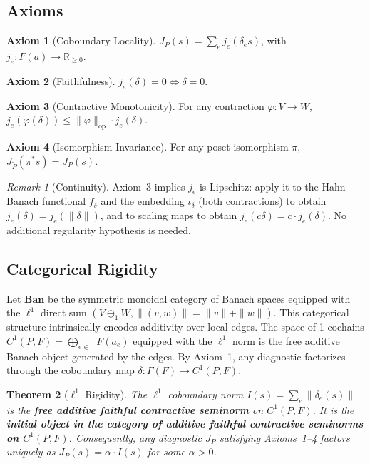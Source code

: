 \documentclass[12pt,a4paper]{amsart}
\theoremstyle{plain}
\newtheorem{theorem}{Theorem}[section]
\theoremstyle{definition}
\newtheorem{axiom}{Axiom}
\theoremstyle{remark}
\newtheorem{remark}[theorem]{Remark}
\newcommand{\R}{\mathbb{R}}
\newcommand{\Ban}{\mathbf{Ban}}
\newcommand{\op}{\mathrm{op}}
\DeclareMathOperator{\Ecov}{E_{\text{cov}}}
\begin{document}
\subsection{Axioms}

\begin{axiom}[Coboundary Locality]
$J_P(s) = \sum_{e} j_e(\delta_e s)$, with
$j_e\colon F(a) \to \R_{\geq 0}$.
\end{axiom}

\begin{axiom}[Faithfulness]
$j_e(\delta) = 0 \iff \delta = 0$.
\end{axiom}

\begin{axiom}[Contractive Monotonicity]
For any contraction $\varphi\colon V \to W$,
$j_e(\varphi(\delta)) \leq \|\varphi\|_{\op} \cdot j_e(\delta)$.
\end{axiom}

\begin{axiom}[Isomorphism Invariance]
For any poset isomorphism $\pi$,
$J_{\tilde{P}}(\pi^* s) = J_P(s)$.
\end{axiom}

\begin{remark}[Continuity]
Axiom~3 implies $j_e$ is Lipschitz: apply it to the Hahn--Banach
functional $f_\delta$ and the embedding $\iota_\delta$ (both
contractions) to obtain $j_e(\delta) = j_e(\|\delta\|)$, and to
scaling maps to obtain $j_e(c\delta) = c \cdot j_e(\delta)$. No
additional regularity hypothesis is needed.
\end{remark}

\subsection{Categorical Rigidity}

Let $\Ban$ be the symmetric monoidal category of Banach spaces equipped
with the $\ell^1$ direct sum
$(V \oplus_1 W, \|(v,w)\| = \|v\| + \|w\|)$.
This categorical structure intrinsically encodes additivity over local
edges. The space of 1-cochains
$C^1(P,F) = \bigoplus_{e \in \Ecov} F(a_e)$ equipped with the
$\ell^1$ norm is the free additive Banach object generated by the
edges. By Axiom~1, any diagnostic factorizes through the coboundary
map $\delta\colon \Gamma(F) \to C^1(P,F)$.

\begin{theorem}[$\ell^1$ Rigidity]
\label{thm:rigidity}
The $\ell^1$ coboundary norm $I(s) = \sum_e \|\delta_e(s)\|$ is the
\textbf{free additive faithful contractive seminorm} on $C^1(P,F)$.
It is the \textbf{initial object in the category of additive faithful
contractive seminorms on $C^1(P,F)$}. Consequently, any diagnostic
$J_P$ satisfying Axioms~1--4 factors uniquely as
$J_P(s) = \alpha \cdot I(s)$ for some $\alpha > 0$.
\end{theorem}
\end{document}
